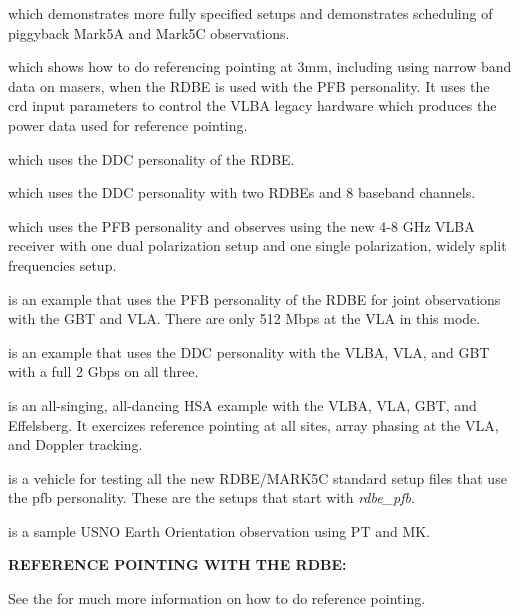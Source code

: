 \documentclass{report}
\begin{document}
 which demonstrates
more fully specified setups and demonstrates scheduling of piggyback
Mark5A and Mark5C observations.

 which
shows how to do referencing pointing at 3mm, including using narrow
band data on masers, when the RDBE is used with the PFB personality.
It uses the crd input parameters to control the VLBA legacy hardware
which produces the power data used for reference pointing.

 which uses the
DDC personality of the RDBE.

 which uses the
DDC personality with two RDBEs and 8 baseband channels.

 which uses the
PFB personality and observes using the new 4-8 GHz VLBA receiver with
one dual polarization setup and one single polarization, widely 
split frequencies setup.

 is an example
that uses the PFB personality of the RDBE for joint observations
with the GBT and VLA.  There are only 512 Mbps at the VLA in this 
mode.

 is an
example that uses the DDC personality with the VLBA, VLA, and GBT 
with a full 2 Gbps on all three.

 is an
all-singing, all-dancing HSA example with the VLBA, VLA, GBT, and
Effelsberg.  It exercizes reference pointing at all sites, array
phasing at the VLA, and Doppler tracking.

 is a
vehicle for testing all the new RDBE/MARK5C standard setup files that
use the pfb personality.  These are the setups that start with 
{\sl rdbe\_pfb}.

 is a
sample USNO Earth Orientation observation using PT and MK.


{\bf REFERENCE POINTING WITH THE RDBE:}

See the  for much
more information on how to do reference pointing.
\end{document}
